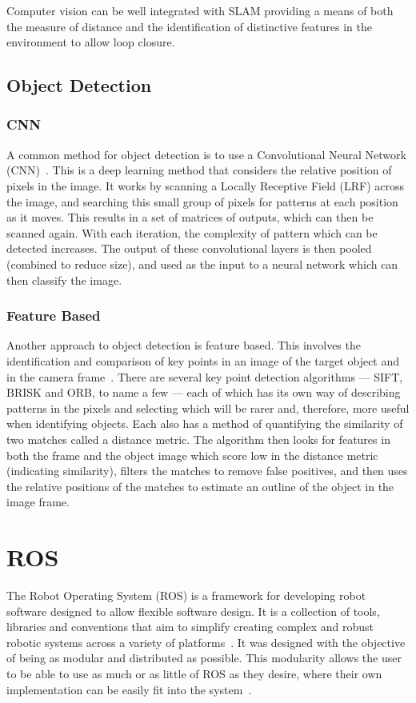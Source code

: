Computer vision can be well integrated with SLAM providing a means of both the measure
of distance and the identification of distinctive
features in the environment to allow loop closure\cite{CVho2006loop}.
\subsection{Object Detection}\label{litreview/cv/objDet}
\subsubsection{CNN}\label{litreview/cv/objDet/CNN}
A common method for object detection is to use a Convolutional
Neural Network (CNN)~\cite{schmidhuber2015deep}. This is a deep learning method that
considers the relative position of pixels in the image. It
works by scanning a Locally Receptive Field (LRF) across the
image, and searching this small group of pixels for patterns
at each position as it moves. This results in a set of
matrices of outputs, which can then be scanned again. With
each iteration, the complexity of pattern which can be detected
increases. The output of these convolutional layers is then
pooled (combined to reduce size), and used as the input to a
neural network which can then classify the image.


\subsubsection{Feature Based}\label{litreview/cv/objDet/fb}
Another approach to object detection is feature based. This
involves the identification and comparison of key points in an
image of the target object and in the camera frame~\cite{lowe2004distinctive}. There are
several key point detection algorithms --- SIFT, BRISK and ORB,
to name a few --- each of which has its own way of describing
patterns in the pixels and selecting which will be rarer and,
therefore, more useful when identifying objects. Each also has
a method of quantifying the similarity of two matches called a
distance metric. The algorithm then looks for features in both
the frame and the object image which score low in the distance
metric (indicating similarity), filters the matches to remove
false positives, and then uses the relative positions of the
matches to estimate an outline of the object in the image
frame.

\section{ROS}\label{litreview/ROS}
The Robot Operating System (ROS) is a framework for developing robot
software designed to allow flexible software design. It is a collection of tools,
libraries and conventions that aim to simplify creating complex and robust robotic systems across a variety of platforms~\cite{aboutROS}.
It was designed with the objective of being as modular and distributed
as possible. This modularity allows the user to be able to use as much or
as little of ROS as they desire, where their own implementation can be
easily fit into the system~\cite{rosForMe}.

